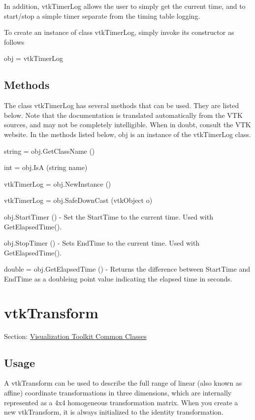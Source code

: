 In addition, vtk\-Timer\-Log allows the user to simply get the current time, and to start/stop a simple timer separate from the timing table logging.

To create an instance of class vtk\-Timer\-Log, simply invoke its constructor as follows \begin{DoxyVerb}  obj = vtkTimerLog
\end{DoxyVerb}
 \hypertarget{vtkwidgets_vtkxyplotwidget_Methods}{}\subsection{Methods}\label{vtkwidgets_vtkxyplotwidget_Methods}
The class vtk\-Timer\-Log has several methods that can be used. They are listed below. Note that the documentation is translated automatically from the V\-T\-K sources, and may not be completely intelligible. When in doubt, consult the V\-T\-K website. In the methods listed below, {\ttfamily obj} is an instance of the vtk\-Timer\-Log class. 
\begin{DoxyItemize}
\item {\ttfamily string = obj.\-Get\-Class\-Name ()}  
\item {\ttfamily int = obj.\-Is\-A (string name)}  
\item {\ttfamily vtk\-Timer\-Log = obj.\-New\-Instance ()}  
\item {\ttfamily vtk\-Timer\-Log = obj.\-Safe\-Down\-Cast (vtk\-Object o)}  
\item {\ttfamily obj.\-Start\-Timer ()} -\/ Set the Start\-Time to the current time. Used with Get\-Elapsed\-Time().  
\item {\ttfamily obj.\-Stop\-Timer ()} -\/ Sets End\-Time to the current time. Used with Get\-Elapsed\-Time().  
\item {\ttfamily double = obj.\-Get\-Elapsed\-Time ()} -\/ Returns the difference between Start\-Time and End\-Time as a doubleing point value indicating the elapsed time in seconds.  
\end{DoxyItemize}\hypertarget{vtkcommon_vtktransform}{}\section{vtk\-Transform}\label{vtkcommon_vtktransform}
Section\-: \hyperlink{sec_vtkcommon}{Visualization Toolkit Common Classes} \hypertarget{vtkwidgets_vtkxyplotwidget_Usage}{}\subsection{Usage}\label{vtkwidgets_vtkxyplotwidget_Usage}
A vtk\-Transform can be used to describe the full range of linear (also known as affine) coordinate transformations in three dimensions, which are internally represented as a 4x4 homogeneous transformation matrix. When you create a new vtk\-Transform, it is always initialized to the identity transformation. 

